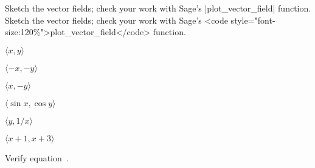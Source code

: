 \exercises

\texonly
Sketch the vector fields; check your work with Sage's \vb|plot_vector_field|
function.
\endtexonly
\htmlonly
Sketch the vector fields; check your work with Sage's 
<code style="font-size:120\%">plot_vector_field</code>
function.
\endhtmlonly

\exercise $\langle x,y\rangle$ 
\endexercise

\exercise $\langle -x, -y\rangle$ 
\endexercise

\exercise $\langle x,-y\rangle$ 
\endexercise

\exercise $\langle \sin x,\cos y\rangle$ 
\endexercise

\exercise $\langle y,1/x\rangle$ 
\endexercise

\exercise $\langle x+1,x+3\rangle$ 
\endexercise

\exercise Verify equation~.
\endexercise

\endexercises

